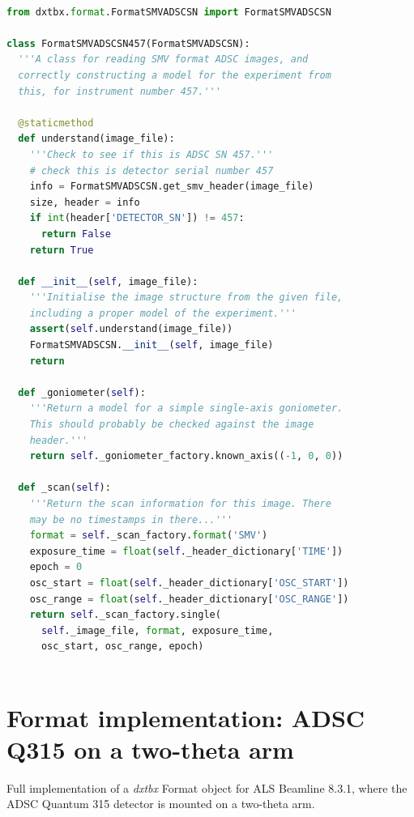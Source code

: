 \documentclass[preprint]{iucr}
\newcommand{\dxtbx}{\emph{dxtbx}\xspace}
\begin{document}
\begin{lstlisting}[language=Python]

from dxtbx.format.FormatSMVADSCSN import FormatSMVADSCSN

class FormatSMVADSCSN457(FormatSMVADSCSN):
  '''A class for reading SMV format ADSC images, and 
  correctly constructing a model for the experiment from 
  this, for instrument number 457.'''

  @staticmethod
  def understand(image_file):
    '''Check to see if this is ADSC SN 457.'''
    # check this is detector serial number 457
    info = FormatSMVADSCSN.get_smv_header(image_file)
    size, header = info
    if int(header['DETECTOR_SN']) != 457:
      return False
    return True

  def __init__(self, image_file):
    '''Initialise the image structure from the given file, 
    including a proper model of the experiment.'''
    assert(self.understand(image_file))
    FormatSMVADSCSN.__init__(self, image_file)
    return

  def _goniometer(self):
    '''Return a model for a simple single-axis goniometer. 
    This should probably be checked against the image 
    header.'''
    return self._goniometer_factory.known_axis((-1, 0, 0))

  def _scan(self):
    '''Return the scan information for this image. There 
    may be no timestamps in there...'''
    format = self._scan_factory.format('SMV')
    exposure_time = float(self._header_dictionary['TIME'])
    epoch = 0
    osc_start = float(self._header_dictionary['OSC_START'])
    osc_range = float(self._header_dictionary['OSC_RANGE'])
    return self._scan_factory.single(
      self._image_file, format, exposure_time,
      osc_start, osc_range, epoch)
      
\end{lstlisting}


\section{Format implementation: ADSC Q315 on a two-theta arm}

Full implementation of a \dxtbx Format object for ALS Beamline 8.3.1, where the 
ADSC Quantum 315 detector is mounted on a two-theta arm. 
\end{document}
